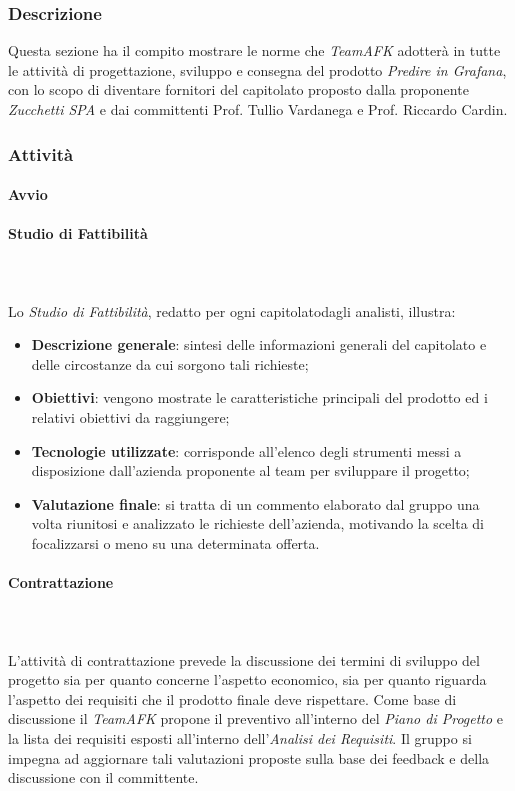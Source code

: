 		\subsubsection{Descrizione}
		Questa sezione ha il compito mostrare le norme che \textit{TeamAFK} adotterà in tutte le attività di progettazione, sviluppo e consegna del prodotto \textit{Predire in Grafana}, con lo scopo di diventare fornitori del capitolato proposto dalla proponente \textit{Zucchetti SPA} e dai committenti Prof. Tullio Vardanega e Prof. Riccardo Cardin.
		\subsubsection{Attività}
			\paragraph{Avvio}
			\paragraph*{Studio di Fattibilità} \mbox{} \\ \mbox{} \\
			Lo \textit{Studio di Fattibilità}, redatto per ogni capitolato\glo dagli analisti, illustra:
			\begin{itemize}
				\item \textbf{Descrizione generale}: sintesi delle informazioni generali del capitolato e delle circostanze da cui sorgono tali richieste;
				\item \textbf{Obiettivi}: vengono mostrate le caratteristiche principali del prodotto ed i relativi obiettivi da raggiungere;
				\item \textbf{Tecnologie utilizzate}: corrisponde all'elenco degli strumenti messi a disposizione dall'azienda proponente al team per sviluppare il progetto;
				\item \textbf{Valutazione finale}: si tratta di un commento elaborato dal gruppo una volta riunitosi e analizzato le  richieste dell'azienda, motivando la scelta di focalizzarsi o meno su una determinata offerta.
			\end{itemize}
			\paragraph{Contrattazione} \mbox{} \\ \mbox{} \\
			L'attività di contrattazione prevede la discussione dei termini di sviluppo del progetto sia per quanto concerne l'aspetto economico, sia per quanto riguarda l'aspetto dei requisiti che il prodotto finale deve rispettare. Come base di discussione il \textit{TeamAFK} propone il preventivo all'interno del \textit{Piano di Progetto} e la lista dei requisiti esposti all'interno dell'\textit{Analisi dei Requisiti}. Il gruppo si impegna ad aggiornare tali
valutazioni proposte sulla base dei feedback e della discussione con il committente.
